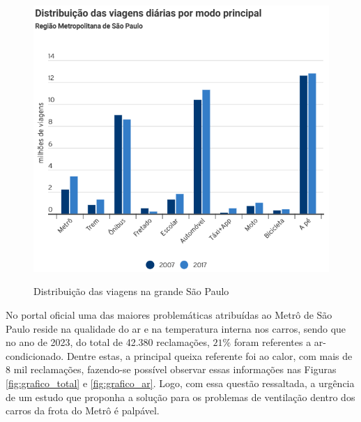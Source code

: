 \documentclass[acronym,symbols,table]{fei}
\begin{document}
\begin{figure}[!htb] 
 \centering
    \caption{Distribuição das viagens na grande São Paulo}
    \includegraphics[width=0.8\linewidth]{Imagens/Distruibuicao.png}
    \label{fig:cnt}
\end{figure}

\newpage 

No portal oficial \textcite{MetroSP} uma das maiores problemáticas atribuídas ao Metrô de São Paulo reside na qualidade do ar e na temperatura interna nos carros, sendo que no ano de 2023, do total de 42.380 reclamações, $21\%$ foram referentes a ar-condicionado. Dentre estas, a principal queixa referente foi ao calor, com mais de 8 mil reclamações, fazendo-se possível observar essas informações nas Figuras \ref{fig:grafico_total} e \ref{fig:grafico_ar}. Logo, com essa questão ressaltada, a urgência de um estudo que proponha a solução para os problemas de ventilação dentro dos carros da frota do Metrô é palpável.
\end{document}
